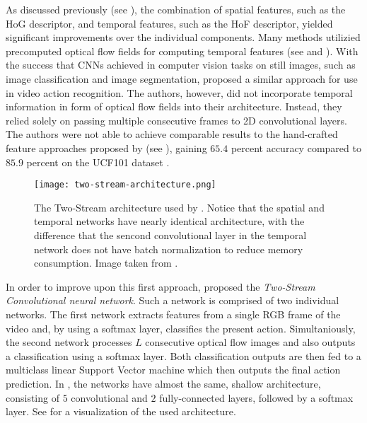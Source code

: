As discussed previously (see ), the combination of spatial features, such as the HoG descriptor, and temporal features, such as the HoF descriptor, yielded significant improvements over the individual components.
Many methods utilizied precomputed optical flow fields for computing temporal features (see  and ).
With the success that CNNs achieved in computer vision tasks on still images, such as image classification and image segmentation, \cite{karpathy_large-scale_2014} proposed a similar approach for use in video action recognition.
The authors, however, did not incorporate temporal information in form of optical flow fields into their architecture.
Instead, they relied solely on passing multiple consecutive frames to 2D convolutional layers.
The authors were not able to achieve comparable results to the hand-crafted feature approaches proposed by \cite{wang_action_2013} (see ), gaining $65.4$ percent accuracy compared to $85.9$ percent on the UCF101 dataset \cite{soomro_ucf101:_2012}.

\begin{figure}[htb!]
    \centering
    \texttt{[image: two-stream-architecture.png]}
    \caption{The Two-Stream architecture used by \cite{simonyan_two-stream_2014}. Notice that the spatial and temporal networks have nearly identical architecture, with the difference that the sencond convolutional layer in the temporal network does not have batch normalization to reduce memory consumption. Image taken from \cite{simonyan_two-stream_2014}. }
    \label{fig:two-stream-architecture}
\end{figure}

In order to improve upon this first approach, \cite{simonyan_two-stream_2014} proposed the \textit{Two-Stream Convolutional neural network}.
Such a network is comprised of two individual networks.
The first network extracts features from a single RGB frame of the video and, by using a softmax layer, classifies the present action.
Simultaniously, the second network processes $L$ consecutive optical flow images and also outputs a classification using a softmax layer.
Both classification outputs are then fed to a multiclass linear Support Vector machine which then outputs the final action prediction.
In \cite{simonyan_two-stream_2014}, the networks have almost the same, shallow architecture, consisting of $5$ convolutional and $2$ fully-connected layers, followed by a softmax layer.
See  for a visualization of the used architecture.

